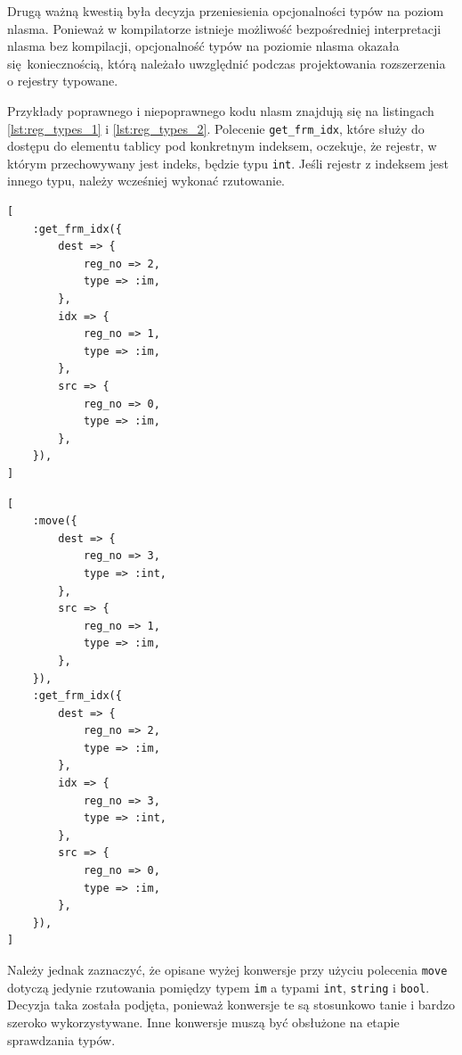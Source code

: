 \documentclass[licencjacka]{pracamgr}
\begin{document}
Drugą ważną kwestią była decyzja przeniesienia opcjonalności typów
na poziom nlasma. Ponieważ w kompilatorze istnieje możliwość bezpośredniej interpretacji nlasma bez kompilacji,
opcjonalność typów na poziomie nlasma okazała się koniecznością, którą należało uwzględnić podczas projektowania
rozszerzenia o rejestry typowane.

Przykłady poprawnego i niepoprawnego kodu nlasm znajdują się na listingach
\ref{lst:reg_types_1} i \ref{lst:reg_types_2}.
Polecenie \texttt{get\_frm\_idx}, które służy do dostępu do elementu tablicy pod konkretnym indeksem, oczekuje,
że rejestr, w którym przechowywany jest indeks, będzie typu \texttt{int}.
Jeśli rejestr z indeksem jest innego typu, należy wcześniej wykonać rzutowanie.

\noindent\begin{minipage}[t]{.45\textwidth}
\begin{lstlisting}[caption={Niepoprawny typowo kod nlasm},label={lst:reg_types_1}]
[
    :get_frm_idx({
        dest => {
            reg_no => 2,
            type => :im,
        },
        idx => {
            reg_no => 1,
            type => :im,
        },
        src => {
            reg_no => 0,
            type => :im,
        },
    }),
]
\end{lstlisting}
\end{minipage}\hfill
\begin{minipage}[t]{.45\textwidth}
\begin{lstlisting}[caption={Poprawny kod nlasm z rzutowaniem},label={lst:reg_types_2}]
[
    :move({
        dest => {
            reg_no => 3,
            type => :int,
        },
        src => {
            reg_no => 1,
            type => :im,
        },
    }),
    :get_frm_idx({
        dest => {
            reg_no => 2,
            type => :im,
        },
        idx => {
            reg_no => 3,
            type => :int,
        },
        src => {
            reg_no => 0,
            type => :im,
        },
    }),
]
\end{lstlisting}
\end{minipage}

Należy jednak zaznaczyć, że opisane wyżej konwersje przy użyciu polecenia \texttt{move} dotyczą jedynie
rzutowania pomiędzy typem \texttt{im} a typami \texttt{int}, \texttt{string} i \texttt{bool}.
Decyzja taka została podjęta, ponieważ konwersje te są stosunkowo tanie i bardzo szeroko wykorzystywane.
Inne konwersje muszą być obsłużone na etapie sprawdzania typów.
\end{document}
